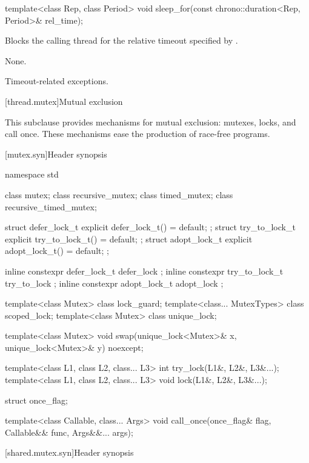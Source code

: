 %
\begin{itemdecl}
template<class Rep, class Period>
  void sleep_for(const chrono::duration<Rep, Period>& rel_time);
\end{itemdecl}

\begin{itemdescr}
\pnum
\effects Blocks the calling thread for the relative timeout specified
by .

\pnum
\sync None.

\pnum
\throws Timeout-related exceptions.
\end{itemdescr}

[thread.mutex]{Mutual exclusion}

\pnum
This subclause provides mechanisms for mutual exclusion: mutexes, locks, and call
once. These mechanisms ease the production of race-free
programs.

[mutex.syn]{Header  synopsis}
%

\begin{codeblock}
namespace std {
  class mutex;
  class recursive_mutex;
  class timed_mutex;
  class recursive_timed_mutex;

  struct defer_lock_t { explicit defer_lock_t() = default; };
  struct try_to_lock_t { explicit try_to_lock_t() = default; };
  struct adopt_lock_t { explicit adopt_lock_t() = default; };

  inline constexpr defer_lock_t  defer_lock { };
  inline constexpr try_to_lock_t try_to_lock { };
  inline constexpr adopt_lock_t  adopt_lock { };

  template<class Mutex> class lock_guard;
  template<class... MutexTypes> class scoped_lock;
  template<class Mutex> class unique_lock;

  template<class Mutex>
    void swap(unique_lock<Mutex>& x, unique_lock<Mutex>& y) noexcept;

  template<class L1, class L2, class... L3> int try_lock(L1&, L2&, L3&...);
  template<class L1, class L2, class... L3> void lock(L1&, L2&, L3&...);

  struct once_flag;

  template<class Callable, class... Args>
    void call_once(once_flag& flag, Callable&& func, Args&&... args);
}
\end{codeblock}

[shared.mutex.syn]{Header  synopsis}
%

